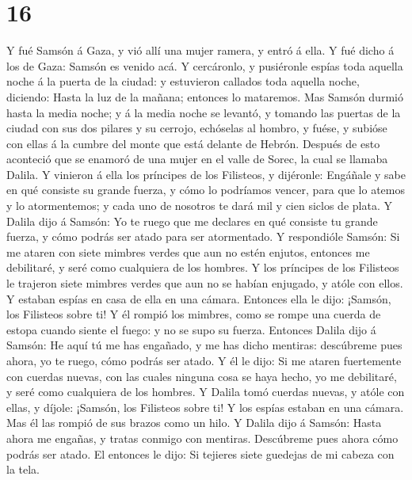 \hypertarget{section-15}{%
\section{16}\label{section-15}}

 Y fué Samsón á Gaza, y vió allí una mujer ramera, y entró
á ella.  Y fué dicho á los de Gaza: Samsón es venido acá.
Y cercáronlo, y pusiéronle espías toda aquella noche á la puerta de la
ciudad: y estuvieron callados toda aquella noche, diciendo: Hasta la luz
de la mañana; entonces lo mataremos.  Mas Samsón durmió
hasta la media noche; y á la media noche se levantó, y tomando las
puertas de la ciudad con sus dos pilares y su cerrojo, echóselas al
hombro, y fuése, y subióse con ellas á la cumbre del monte que está
delante de Hebrón.  Después de esto aconteció que se
enamoró de una mujer en el valle de Sorec, la cual se llamaba Dalila.
 Y vinieron á ella los príncipes de los Filisteos, y
dijéronle: Engáñale y sabe en qué consiste su grande fuerza, y cómo lo
podríamos vencer, para que lo atemos y lo atormentemos; y cada uno de
nosotros te dará mil y cien siclos de plata.  Y Dalila
dijo á Samsón: Yo te ruego que me declares en qué consiste tu grande
fuerza, y cómo podrás ser atado para ser atormentado.  Y
respondióle Samsón: Si me ataren con siete mimbres verdes que aun no
estén enjutos, entonces me debilitaré, y seré como cualquiera de los
hombres.  Y los príncipes de los Filisteos le trajeron
siete mimbres verdes que aun no se habían enjugado, y atóle con ellos.
 Y estaban espías en casa de ella en una cámara. Entonces
ella le dijo: ¡Samsón, los Filisteos sobre ti! Y él rompió los mimbres,
como se rompe una cuerda de estopa cuando siente el fuego: y no se supo
su fuerza.  Entonces Dalila dijo á Samsón: He aquí tú me
has engañado, y me has dicho mentiras: descúbreme pues ahora, yo te
ruego, cómo podrás ser atado.  Y él le dijo: Si me ataren
fuertemente con cuerdas nuevas, con las cuales ninguna cosa se haya
hecho, yo me debilitaré, y seré como cualquiera de los hombres.
 Y Dalila tomó cuerdas nuevas, y atóle con ellas, y
díjole: ¡Samsón, los Filisteos sobre ti! Y los espías estaban en una
cámara. Mas él las rompió de sus brazos como un hilo.  Y
Dalila dijo á Samsón: Hasta ahora me engañas, y tratas conmigo con
mentiras. Descúbreme pues ahora cómo podrás ser atado. El entonces le
dijo: Si tejieres siete guedejas de mi cabeza con la tela.
